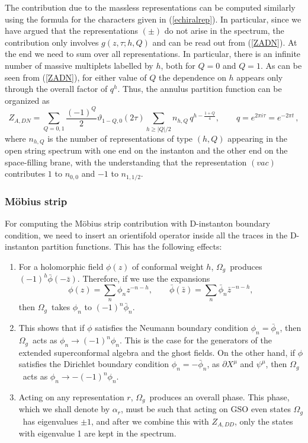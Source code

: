 \documentclass[12pt,a4paper]{article}
\newcommand{\be}{\begin{equation}}
\newcommand{\ee}{\end{equation}}
\newcommand{\refb}[1]{(\ref{#1})}
\newcommand{\p}{\partial}
\newcommand{\vt}{\vartheta}
\def\bz{\bar z}
\newcommand{\oo}{{$\Omega_g$}}
\begin{document}
The contribution due to the massless representations can be computed similarly using the formula
for the characters given in \refb{echiralrep}.  In particular, since we have argued that the
representations $(\pm)$ do not arise in the spectrum, the contribution only involves
$g(z,\tau;h,Q)$ and can be read out from \refb{ZADN}.
At the end we need to sum over all representations.
In particular, there is an infinite number of massive multiplets
labelled by $h$, both for $Q=0$ and $Q=1$. As can be seen from \refb{ZADN}, for either value of $Q$
the dependence on $h$ appears only through the overall factor of $q^h$.
Thus, the annulus partition function can be organized as
\be\label{endfinal}
Z_{A,DN} = \sum_{Q=0,1}  \frac{(-1)^{Q}}{2}  \vt_{1-Q,0}(2\tau)
\sum_{h\ge |Q|/2}  n_{h,Q} \,
q^{h -\frac{1+Q}{4} },
\qquad
q=e^{2\pi i\tau}=e^{-2\pi t}\, ,
\ee
where $n_{h,Q}$ is the number of representations of type $(h,Q)$ appearing in the
open string spectrum with one end on the instanton and the other end on the
space-filling brane, with the understanding that the
representation $(vac)$ contributes $1$ to $n_{0,0}$ and $-1$ to $n_{1,1/2}$.




\subsubsection{M\"{o}bius strip} \label{smobius}

For computing the M\"{o}bius strip contribution with D-instanton boundary condition,
we need to insert an orientifold operator inside
all the traces in the D-instanton partition functions. This has the following effects:
\begin{enumerate}
\item
For a holomorphic field $\phi(z)$ of conformal weight $h$,
\oo\ produces $(-1)^h \bar\phi(-\bar z)$. Therefore, if we use the
expansions
\be
\phi(z) =\sum_n \phi_n z^{-n-h}, \qquad \bar\phi(\bz) =\sum_n \bar\phi_n \bz^{-n-h},
\ee
then \oo\ takes $\phi_n$ to $(-1)^n \bar\phi_n$.

\item
This shows that if $\phi$ satisfies the Neumann boundary condition $\phi_n=\bar\phi_n$,
then \oo\ acts as $\phi_n\to (-1)^n \phi_n$. This is the case for the
generators of the extended superconformal algebra and the ghost fields.
On the other hand, if $\phi$ satisfies
the Dirichlet boundary condition $\phi_n=-\bar\phi_n$,
as $\p X^\mu$ and $\psi^\mu$, then \oo\
acts as $\phi_n\to -(-1)^n \phi_n$.

\item
Acting on any representation $r$, \oo\ produces an overall phase. This
phase, which
we shall denote by $\alpha_r$, must be such that acting on GSO even states
\oo\ has eigenvalues $\pm 1$, and after we combine this with $Z_{A,DD}$, only the
states with eigenvalue 1 are kept in the
spectrum.
\end{enumerate}
\end{document}
